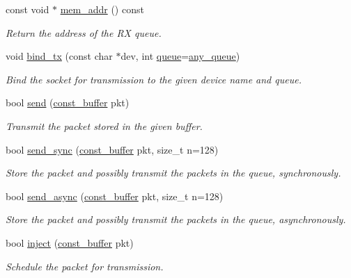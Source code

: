\begin{DoxyCompactItemize}
const void $\ast$ \hyperlink{classnet_1_1pfq_a1f16289a4ddffd497ef2dd9c7523bccb}{mem\+\_\+addr} () const 
\begin{DoxyCompactList}\small\item\em Return the address of the R\+X queue. \end{DoxyCompactList}\item 
void \hyperlink{classnet_1_1pfq_a00ba716bc74388ec7facc7c59d92fa6d}{bind\+\_\+tx} (const char $\ast$dev, int \hyperlink{classnet_1_1queue}{queue}=\hyperlink{classnet_1_1pfq_a0d4eca6d0925b7c49365675c9cf9385c}{any\+\_\+queue})
\begin{DoxyCompactList}\small\item\em Bind the socket for transmission to the given device name and queue. \end{DoxyCompactList}\item 
bool \hyperlink{classnet_1_1pfq_a9bd5ed424666bbfc6c54de476b3ee274}{send} (\hyperlink{namespacenet_a05639001760fe5164b163078b5ccc2c0}{const\+\_\+buffer} pkt)
\begin{DoxyCompactList}\small\item\em Transmit the packet stored in the given buffer. \end{DoxyCompactList}\item 
bool \hyperlink{classnet_1_1pfq_adfa55afc44e561314349bf5995c06bae}{send\+\_\+sync} (\hyperlink{namespacenet_a05639001760fe5164b163078b5ccc2c0}{const\+\_\+buffer} pkt, size\+\_\+t n=128)
\begin{DoxyCompactList}\small\item\em Store the packet and possibly transmit the packets in the queue, synchronously. \end{DoxyCompactList}\item 
bool \hyperlink{classnet_1_1pfq_a133184c3a7eee9b8110941436de0a05d}{send\+\_\+async} (\hyperlink{namespacenet_a05639001760fe5164b163078b5ccc2c0}{const\+\_\+buffer} pkt, size\+\_\+t n=128)
\begin{DoxyCompactList}\small\item\em Store the packet and possibly transmit the packets in the queue, asynchronously. \end{DoxyCompactList}\item 
bool \hyperlink{classnet_1_1pfq_ac3ff560f61fb181bbc94f305c8f98569}{inject} (\hyperlink{namespacenet_a05639001760fe5164b163078b5ccc2c0}{const\+\_\+buffer} pkt)
\begin{DoxyCompactList}\small\item\em Schedule the packet for transmission. \end{DoxyCompactList}\item 

\end{DoxyCompactItemize}
